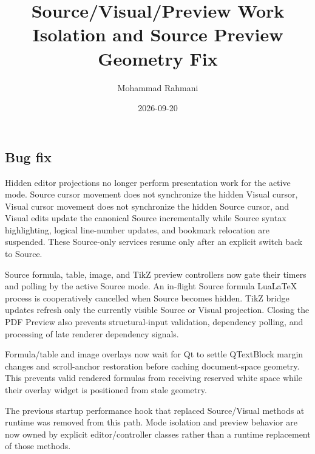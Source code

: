 \documentclass[a4paper]{article}
\title{Source/Visual/Preview Work Isolation and Source Preview Geometry Fix}
\date{2026-09-20}
\author{Mohammad Rahmani}
\begin{document}
   \maketitle

   \begin{preview}
      \section{Bug fix}
      Hidden editor projections no longer perform presentation work for the active
      mode. Source cursor movement does not synchronize the hidden Visual cursor,
      Visual cursor movement does not synchronize the hidden Source cursor, and
      Visual edits update the canonical Source incrementally while Source syntax
      highlighting, logical line-number updates, and bookmark relocation are
      suspended. These Source-only services resume only after an explicit switch
      back to Source.

      Source formula, table, image, and TikZ preview controllers now gate their
      timers and polling by the active Source mode. An in-flight Source formula
      LuaLaTeX process is cooperatively cancelled when Source becomes hidden.
      TikZ bridge updates refresh
      only the currently visible Source or Visual projection. Closing the PDF
      Preview also prevents structural-input validation, dependency polling, and
      processing of late renderer dependency signals.

      Formula/table and image overlays now wait for Qt to settle QTextBlock margin
      changes and scroll-anchor restoration before caching document-space geometry.
      This prevents valid rendered formulas from receiving reserved white space
      while their overlay widget is positioned from stale geometry.

      The previous startup performance hook that replaced Source/Visual methods at
      runtime was removed from this path. Mode isolation and preview behavior are
      now owned by explicit editor/controller classes rather than a runtime
      replacement of those methods.
   \end{preview}

   
   
\end{document}
